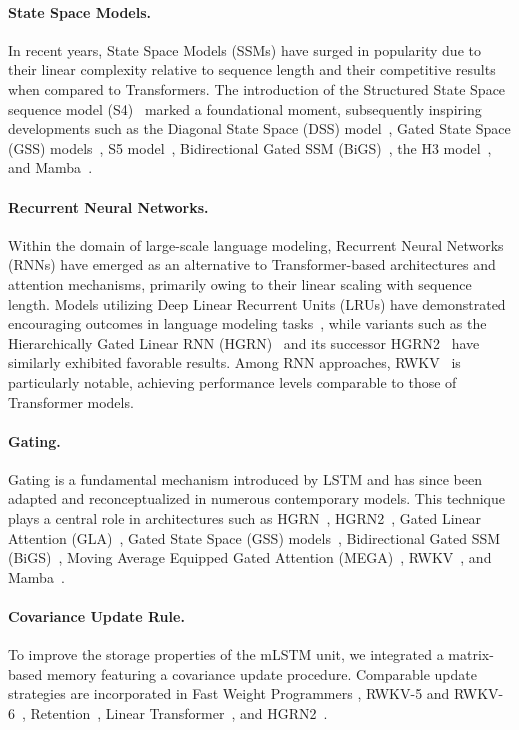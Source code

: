 \paragraph{State Space Models.} In recent years, State Space Models (SSMs) have surged in popularity due to their linear complexity relative to sequence length and their competitive results when compared to Transformers. The introduction of the Structured State Space sequence model (S4)~\citep{Gu:21} marked a foundational moment, subsequently inspiring developments such as the Diagonal State Space (DSS) model~\citep{Gupta:22}, Gated State Space (GSS) models~\citep{Mehta:22}, S5 model~\citep{Smith:22}, Bidirectional Gated SSM (BiGS)~\citep{Wang:22}, the H3 model~\citep{Fu:23}, and Mamba~\citep{Gu:24arxiv}.

\paragraph{Recurrent Neural Networks.} Within the domain of large-scale language modeling, Recurrent Neural Networks (RNNs) have emerged as an alternative to Transformer-based architectures and attention mechanisms, primarily owing to their linear scaling with sequence length. Models utilizing Deep Linear Recurrent Units (LRUs) have demonstrated encouraging outcomes in language modeling tasks~\citep{Orvieto:23, De:24arxiv}, while variants such as the Hierarchically Gated Linear RNN (HGRN)~\citep{Qin:23} and its successor HGRN2~\citep{Qin:24arxiv} have similarly exhibited favorable results. Among RNN approaches, RWKV~\citep{Peng:23arxivshort,Peng:24arxivshort} is particularly notable, achieving performance levels comparable to those of Transformer models.

\paragraph{Gating.}
Gating is a fundamental mechanism introduced by LSTM and has since been adapted and reconceptualized in numerous contemporary models. This technique plays a central role in architectures such as HGRN~\citep{Qin:23}, HGRN2~\citep{Qin:24arxiv}, Gated Linear Attention (GLA)~\citep{Yang:23arxiv}, Gated State Space (GSS) models~\citep{Mehta:22}, Bidirectional Gated SSM (BiGS)~\citep{Wang:22}, Moving Average Equipped Gated Attention (MEGA)~\citep{Ma:22}, RWKV~\citep{Peng:23arxivshort}, and Mamba~\citep{Gu:24arxiv}.

\paragraph{Covariance Update Rule.} To improve the storage properties of the mLSTM unit, we integrated a matrix-based memory featuring a covariance update procedure. Comparable update strategies are incorporated in Fast Weight Programmers \citep{Schmidhuber:92ncfastweights,Schlag:21}, RWKV-5 and RWKV-6~\citep{Peng:24arxivshort}, Retention~\citep{Sun:23arxiv}, Linear Transformer~\citep{Katharopoulos:20}, and HGRN2~\citep{Qin:24arxiv}.

